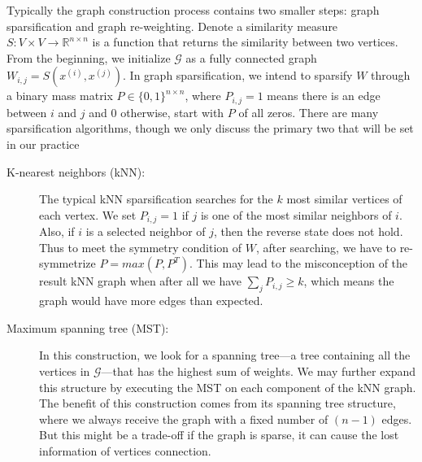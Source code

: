 Typically the graph construction process contains two smaller steps: graph sparsification and graph re-weighting. Denote a similarity measure $S: V\times V \rightarrow \mathbb{R}^{n\times n}$ is a function that returns the similarity between two vertices. From the beginning, we initialize $\mathcal{G}$ as a fully connected graph $W_{i,j} = S(x^{(i)}, x^{(j)})$. In graph sparsification, we intend to sparsify $W$ through a binary mass matrix $P \in \{0, 1\}^{n\times n}$, where $P_{i,j} = 1$ means there is an edge between $i$ and $j$ and $0$ otherwise, start with $P$ of all zeros. There are many sparsification algorithms, though we only discuss the primary two that will be set in our practice
\begin{description}
	\item[K-nearest neighbors (kNN):] The typical kNN sparsification searches for the $k$ most similar vertices of each vertex. We set $P_{i,j} = 1$ if $j$ is one of the most similar neighbors of $i$. Also, if $i$ is a selected neighbor of $j$, then the reverse state does not hold. Thus to meet the symmetry condition of $W$, after searching, we have to re-symmetrize $P = max(P, P^T)$. This may lead to the misconception of the result kNN graph when after all we have $\sum_{j}{P_{i,j}} \geq k$, which means the graph would have more edges than expected.
	
	 \item[Maximum spanning tree (MST):] In this construction, we look for a spanning tree---a tree containing all the vertices in $\mathcal{G}$---that has the highest sum of weights. We may further expand this structure by executing the MST on each component of the kNN graph. The benefit of this construction comes from its spanning tree structure, where we always receive the graph with a fixed number of $(n-1)$ edges. But this might be a trade-off if the graph is sparse, it can cause the lost information of vertices connection.
\end{description}

